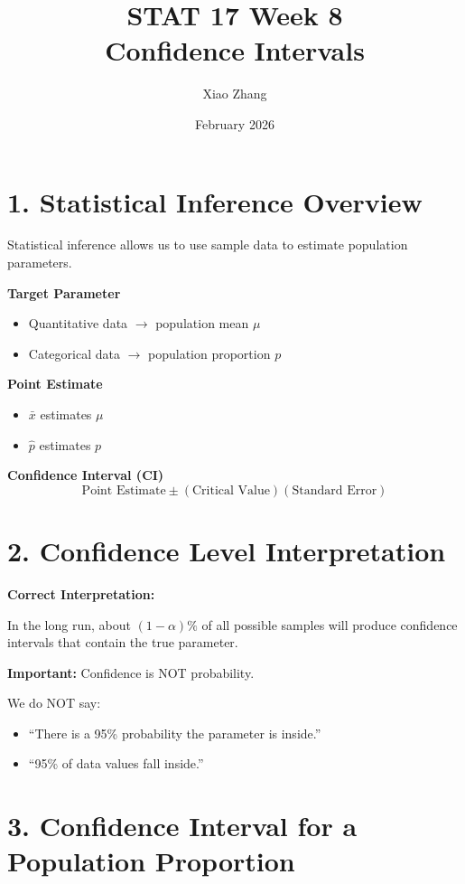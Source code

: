 \documentclass[11pt]{article}
\title{STAT 17 Week 8 \\Confidence Intervals}
\author{Xiao Zhang}
\date{February 2026}
\begin{document}
\maketitle

\section*{1. Statistical Inference Overview}

Statistical inference allows us to use sample data to estimate population parameters.

\textbf{Target Parameter}
\begin{itemize}
    \item Quantitative data $\rightarrow$ population mean $\mu$
    \item Categorical data $\rightarrow$ population proportion $p$
\end{itemize}

\textbf{Point Estimate}
\begin{itemize}
    \item $\bar{x}$ estimates $\mu$
    \item $\hat{p}$ estimates $p$
\end{itemize}

\textbf{Confidence Interval (CI)}
\[
\text{Point Estimate} \pm (\text{Critical Value})(\text{Standard Error})
\]

\section*{2. Confidence Level Interpretation}

\textbf{Correct Interpretation:}

In the long run, about $(1-\alpha)\%$ of all possible samples will produce confidence intervals that contain the true parameter.

\textbf{Important:} Confidence is NOT probability.

We do NOT say:
\begin{itemize}
    \item ``There is a 95\% probability the parameter is inside.''
    \item ``95\% of data values fall inside.''
\end{itemize}

\section*{3. Confidence Interval for a Population Proportion}
\end{document}
